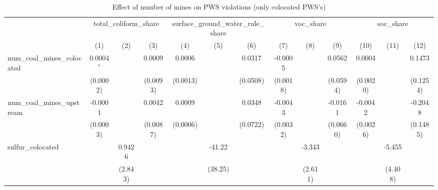 
\begin{table}[htbp]
   \caption{\label{olsrf2sls_nummine_non_mine_vio_1985to2005colocate} Effect of number of mines on PWS violations (only colocated PWS's)}
   \bigskip
   \centering
   \begin{adjustbox}{width = \textwidth, center}
      \begin{tabular}{lcccccccccccc}
         \toprule
          & \multicolumn{3}{c}{total\_coliform\_share} & \multicolumn{3}{c}{surface\_ground\_water\_rule\_share} & \multicolumn{3}{c}{voc\_share} & \multicolumn{3}{c}{soc\_share}\\
                                                            & (1)           & (2)           & (3)           & (4)           & (5)           & (6)           & (7)           & (8)           & (9)           & (10)          & (11)           & (12)\\  
         \midrule 
         num\_coal\_mines\_colocated                        & 0.0004$^{*}$  &               & 0.0009        & 0.0006        &               & 0.0317        & -0.0005       &               & 0.0562        & 0.0004        &                & 0.1473\\   
                                                            & (0.0002)      &               & (0.0093)      & (0.0013)      &               & (0.0508)      & (0.0018)      &               & (0.0594)      & (0.0020)      &                & (0.1254)\\   
         num\_coal\_mines\_upstream                         & -0.0001       &               & 0.0042        & 0.0009        &               & 0.0348        & -0.0043       &               & -0.0161       & -0.0042       &                & -0.2048\\   
                                                            & (0.0003)      &               & (0.0087)      & (0.0006)      &               & (0.0722)      & (0.0032)      &               & (0.0660)      & (0.0026)      &                & (0.1485)\\   
         sulfur\_colocated                                  &               & 0.9426        &               &               & -41.22        &               &               & -3.343        &               &               & -5.455         &   \\   
                                                            &               & (2.843)       &               &               & (38.25)       &               &               & (2.611)       &               &               & (4.408)        &   \\   

\end{tabular}
\end{adjustbox}
\end{table}
